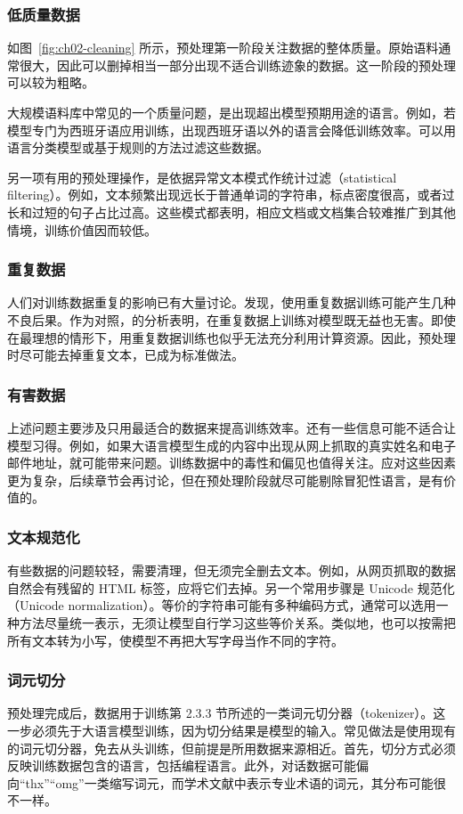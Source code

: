 \subsubsection{低质量数据}
如图~\ref{fig:ch02-cleaning} 所示，预处理第一阶段关注数据的整体质量。原始语料通常很大，因此可以删掉相当一部分出现不适合训练迹象的数据。这一阶段的预处理可以较为粗略。

大规模语料库中常见的一个质量问题，是出现超出模型预期用途的语言。例如，若模型专门为西班牙语应用训练，出现西班牙语以外的语言会降低训练效率。可以用语言分类模型或基于规则的方法过滤这些数据。

另一项有用的预处理操作，是依据异常文本模式作统计过滤（statistical filtering）。例如，文本频繁出现远长于普通单词的字符串，标点密度很高，或者过长和过短的句子占比过高。这些模式都表明，相应文档或文档集合较难推广到其他情境，训练价值因而较低。

\subsubsection{重复数据}
人们对训练数据重复的影响已有大量讨论。发现，使用重复数据训练可能产生几种不良后果。作为对照，的分析表明，在重复数据上训练对模型既无益也无害。即使在最理想的情形下，用重复数据训练也似乎无法充分利用计算资源。因此，预处理时尽可能去掉重复文本，已成为标准做法。

\subsubsection{有害数据}
上述问题主要涉及只用最适合的数据来提高训练效率。还有一些信息可能不适合让模型习得。例如，如果大语言模型生成的内容中出现从网上抓取的真实姓名和电子邮件地址，就可能带来问题。训练数据中的毒性和偏见也值得关注。应对这些因素更为复杂，后续章节会再讨论，但在预处理阶段就尽可能剔除冒犯性语言，是有价值的。

\subsubsection{文本规范化}
有些数据的问题较轻，需要清理，但无须完全删去文本。例如，从网页抓取的数据自然会有残留的 HTML 标签，应将它们去掉。另一个常用步骤是 Unicode 规范化（Unicode normalization）。等价的字符串可能有多种编码方式，通常可以选用一种方法尽量统一表示，无须让模型自行学习这些等价关系。类似地，也可以按需把所有文本转为小写，使模型不再把大写字母当作不同的字符。

\subsubsection{词元切分}
预处理完成后，数据用于训练第 2.3.3 节所述的一类词元切分器（tokenizer）。这一步必须先于大语言模型训练，因为切分结果是模型的输入。常见做法是使用现有的词元切分器，免去从头训练，但前提是所用数据来源相近。首先，切分方式必须反映训练数据包含的语言，包括编程语言。此外，对话数据可能偏向“thx”“omg”一类缩写词元，而学术文献中表示专业术语的词元，其分布可能很不一样。

